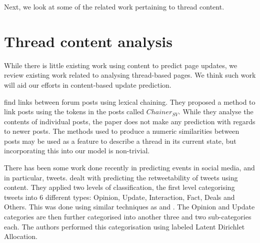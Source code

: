 Next, we look at some of the related work
pertaining to thread content.

\section{Thread content analysis}
While there is little existing work using content to predict page updates, we 
review existing work related to analysing thread-based pages.  We 
think such work will aid our efforts in content-based update prediction.

 find links between forum posts using 
lexical chaining. They proposed a method to link posts using the tokens in the 
posts called $Chainer_{SV}$. While they analyse the contents of individual 
posts, the paper does not make any prediction with regards to newer posts. The 
methods used to produce a numeric similarities between posts may be used as a 
feature to describe a thread in its current state, 
but incorporating this into 
our model is non-trivial.

There has been some work done recently in predicting events in social media, and 
in particular, tweets.   dealt with predicting the retweetability 
of tweets using content. They applied two levels of classification, the first 
level categorising tweets into 6 different types: Opinion, Update, Interaction, 
Fact, Deals and Others. This was done using similar techniques as 
 and . The Opinion and Update categories 
are then further categorised into another three and two sub-categories each. The 
authors performed this categorisation using labeled Latent Dirichlet Allocation.




